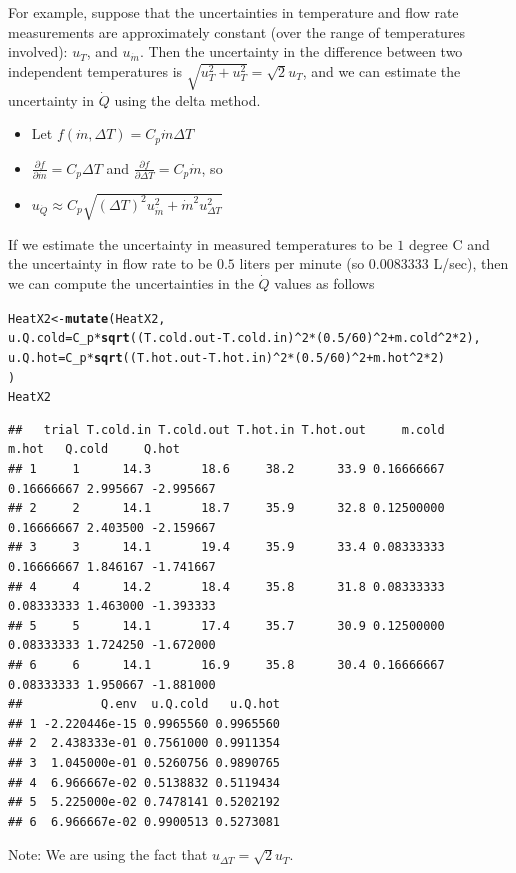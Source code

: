 \documentclass[twoside]{book}\usepackage[]{graphicx}\usepackage[]{xcolor}
\makeatletter
\newcommand{\hlnum}[1]{\textcolor[rgb]{0.686,0.059,0.569}{#1}}%
\newcommand{\hlopt}[1]{\textcolor[rgb]{0,0,0}{#1}}%
\newcommand{\hlstd}[1]{\textcolor[rgb]{0.345,0.345,0.345}{#1}}%
\newcommand{\hlkwb}[1]{\textcolor[rgb]{0.69,0.353,0.396}{#1}}%
\newcommand{\hlkwc}[1]{\textcolor[rgb]{0.333,0.667,0.333}{#1}}%
\newcommand{\hlkwd}[1]{\textcolor[rgb]{0.737,0.353,0.396}{\textbf{#1}}}%
\newenvironment{kframe}{%
 \def\at@end@of@kframe{}%
 \ifinner\ifhmode%
  \def\at@end@of@kframe{\end{minipage}}%
  \begin{minipage}{\columnwidth}%
 \fi\fi%
 \def\FrameCommand##1{\hskip\@totalleftmargin \hskip-\fboxsep
 \colorbox{shadecolor}{##1}\hskip-\fboxsep
     \hskip-\linewidth \hskip-\@totalleftmargin \hskip\columnwidth}%
 \MakeFramed {\advance\hsize-\width
   \@totalleftmargin\z@ \linewidth\hsize
   \@setminipage}}%
 {\par\unskip\endMakeFramed%
 \at@end@of@kframe}
\newenvironment{knitrout}{}{} %
\newcommand{\Partial}[2]{\frac{\partial #1}{\partial #2}}
\newcounter{example}[section]
\makeatother
\begin{document}
For example, suppose that the uncertainties in temperature and flow rate 
measurements  are approximately constant (over the range of temperatures involved): 
$u_T$, and  $u_{\dot{m}}$.  Then the uncertainty in the difference between two
independent temperatures is 
$\sqrt{ u_T^2 + u_T^2 } = \sqrt{2} u_T$, and we can estimate the uncertainty in
$\dot Q$ using the delta method.

\begin{itemize}
\item
Let $f(\dot{m}, \Delta T) = C_p \dot{m} \Delta T$
\item
$ \displaystyle \Partial{f}{\dot m} = C_p \Delta T$ and 
$ \displaystyle \Partial{f}{\Delta T} = C_p \dot{m}$, so
\item
$ \displaystyle
u_{\dot Q} \approx   C_p \sqrt{ (\Delta T)^2 u^2_{\dot m}  + \dot{m}^2 u_{\Delta T}^2 }
$
\end{itemize}

If we estimate the uncertainty in measured temperatures
to be $1$ degree C and the uncertainty in flow rate to be $0.5$ liters per
minute (so 0.0083333 L/sec), then we can compute the uncertainties in 
the $\dot{Q}$ values as follows
\begin{knitrout}
\color{fgcolor}\begin{kframe}
\begin{alltt}
\hlstd{HeatX2}\hlkwb{<-} \hlkwd{mutate}\hlstd{(HeatX2,}
  \hlkwc{u.Q.cold} \hlstd{= C_p} \hlopt{*}\hlkwd{sqrt}\hlstd{( (T.cold.out} \hlopt{-}\hlstd{T.cold.in )}\hlopt{^}\hlnum{2} \hlopt{*} \hlstd{(}\hlnum{0.5}\hlopt{/}\hlnum{60}\hlstd{)}\hlopt{^}\hlnum{2}  \hlopt{+} \hlstd{m.cold}\hlopt{^}\hlnum{2} \hlopt{*} \hlnum{2}\hlstd{),}
  \hlkwc{u.Q.hot} \hlstd{=  C_p} \hlopt{*}\hlkwd{sqrt}\hlstd{(  (T.hot.out} \hlopt{-}\hlstd{T.hot.in )}\hlopt{^}\hlnum{2}  \hlopt{*} \hlstd{(}\hlnum{0.5}\hlopt{/}\hlnum{60}\hlstd{)}\hlopt{^}\hlnum{2}  \hlopt{+}  \hlstd{m.hot}\hlopt{^}\hlnum{2} \hlopt{*} \hlnum{2}\hlstd{)}
\hlstd{)}
\hlstd{HeatX2}
\end{alltt}
\begin{verbatim}
##   trial T.cold.in T.cold.out T.hot.in T.hot.out     m.cold      m.hot   Q.cold     Q.hot
## 1     1      14.3       18.6     38.2      33.9 0.16666667 0.16666667 2.995667 -2.995667
## 2     2      14.1       18.7     35.9      32.8 0.12500000 0.16666667 2.403500 -2.159667
## 3     3      14.1       19.4     35.9      33.4 0.08333333 0.16666667 1.846167 -1.741667
## 4     4      14.2       18.4     35.8      31.8 0.08333333 0.08333333 1.463000 -1.393333
## 5     5      14.1       17.4     35.7      30.9 0.12500000 0.08333333 1.724250 -1.672000
## 6     6      14.1       16.9     35.8      30.4 0.16666667 0.08333333 1.950667 -1.881000
##           Q.env  u.Q.cold   u.Q.hot
## 1 -2.220446e-15 0.9965560 0.9965560
## 2  2.438333e-01 0.7561000 0.9911354
## 3  1.045000e-01 0.5260756 0.9890765
## 4  6.966667e-02 0.5138832 0.5119434
## 5  5.225000e-02 0.7478141 0.5202192
## 6  6.966667e-02 0.9900513 0.5273081
\end{verbatim}
\end{kframe}
\end{knitrout}
Note: We are using the fact that $u_{\Delta T} = \sqrt{2} u_T$.
\end{document}
